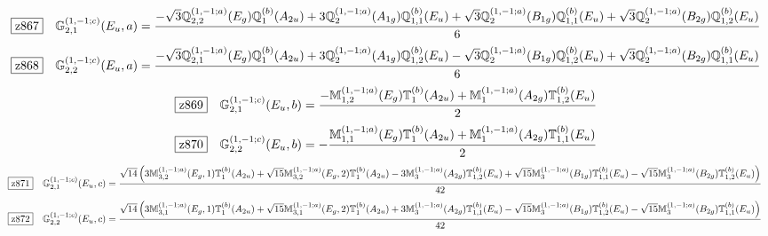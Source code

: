 \documentclass[fleqn,10pt,landscape]{jsarticle}
\begin{document}
\begin{dmath*}
\hspace*{3mm}\fbox{z867}\quad \mathbb{G}_{2,1}^{(1,-1;c)}(E_{u},a)=\frac{- \sqrt{3} \mathbb{Q}_{2,2}^{(1,-1;a)}(E_{g}) \mathbb{Q}_{1}^{(b)}(A_{2u}) + 3 \mathbb{Q}_{2}^{(1,-1;a)}(A_{1g}) \mathbb{Q}_{1,1}^{(b)}(E_{u}) + \sqrt{3} \mathbb{Q}_{2}^{(1,-1;a)}(B_{1g}) \mathbb{Q}_{1,1}^{(b)}(E_{u}) + \sqrt{3} \mathbb{Q}_{2}^{(1,-1;a)}(B_{2g}) \mathbb{Q}_{1,2}^{(b)}(E_{u})}{6}
\end{dmath*}
\begin{dmath*}
\hspace*{3mm}\fbox{z868}\quad \mathbb{G}_{2,2}^{(1,-1;c)}(E_{u},a)=\frac{- \sqrt{3} \mathbb{Q}_{2,1}^{(1,-1;a)}(E_{g}) \mathbb{Q}_{1}^{(b)}(A_{2u}) + 3 \mathbb{Q}_{2}^{(1,-1;a)}(A_{1g}) \mathbb{Q}_{1,2}^{(b)}(E_{u}) - \sqrt{3} \mathbb{Q}_{2}^{(1,-1;a)}(B_{1g}) \mathbb{Q}_{1,2}^{(b)}(E_{u}) + \sqrt{3} \mathbb{Q}_{2}^{(1,-1;a)}(B_{2g}) \mathbb{Q}_{1,1}^{(b)}(E_{u})}{6}
\end{dmath*}
\begin{dmath*}
\hspace*{3mm}\fbox{z869}\quad \mathbb{G}_{2,1}^{(1,-1;c)}(E_{u},b)=\frac{- \mathbb{M}_{1,2}^{(1,-1;a)}(E_{g}) \mathbb{T}_{1}^{(b)}(A_{2u}) + \mathbb{M}_{1}^{(1,-1;a)}(A_{2g}) \mathbb{T}_{1,2}^{(b)}(E_{u})}{2}
\end{dmath*}
\begin{dmath*}
\hspace*{3mm}\fbox{z870}\quad \mathbb{G}_{2,2}^{(1,-1;c)}(E_{u},b)=- \frac{\mathbb{M}_{1,1}^{(1,-1;a)}(E_{g}) \mathbb{T}_{1}^{(b)}(A_{2u}) + \mathbb{M}_{1}^{(1,-1;a)}(A_{2g}) \mathbb{T}_{1,1}^{(b)}(E_{u})}{2}
\end{dmath*}
\begin{dmath*}
\hspace*{3mm}\fbox{z871}\quad \mathbb{G}_{2,1}^{(1,-1;c)}(E_{u},c)=\frac{\sqrt{14} \left(3 \mathbb{M}_{3,2}^{(1,-1;a)}(E_{g},1) \mathbb{T}_{1}^{(b)}(A_{2u}) + \sqrt{15} \mathbb{M}_{3,2}^{(1,-1;a)}(E_{g},2) \mathbb{T}_{1}^{(b)}(A_{2u}) - 3 \mathbb{M}_{3}^{(1,-1;a)}(A_{2g}) \mathbb{T}_{1,2}^{(b)}(E_{u}) + \sqrt{15} \mathbb{M}_{3}^{(1,-1;a)}(B_{1g}) \mathbb{T}_{1,1}^{(b)}(E_{u}) - \sqrt{15} \mathbb{M}_{3}^{(1,-1;a)}(B_{2g}) \mathbb{T}_{1,2}^{(b)}(E_{u})\right)}{42}
\end{dmath*}
\begin{dmath*}
\hspace*{3mm}\fbox{z872}\quad \mathbb{G}_{2,2}^{(1,-1;c)}(E_{u},c)=\frac{\sqrt{14} \left(3 \mathbb{M}_{3,1}^{(1,-1;a)}(E_{g},1) \mathbb{T}_{1}^{(b)}(A_{2u}) + \sqrt{15} \mathbb{M}_{3,1}^{(1,-1;a)}(E_{g},2) \mathbb{T}_{1}^{(b)}(A_{2u}) + 3 \mathbb{M}_{3}^{(1,-1;a)}(A_{2g}) \mathbb{T}_{1,1}^{(b)}(E_{u}) - \sqrt{15} \mathbb{M}_{3}^{(1,-1;a)}(B_{1g}) \mathbb{T}_{1,2}^{(b)}(E_{u}) - \sqrt{15} \mathbb{M}_{3}^{(1,-1;a)}(B_{2g}) \mathbb{T}_{1,1}^{(b)}(E_{u})\right)}{42}
\end{dmath*}
\end{document}
